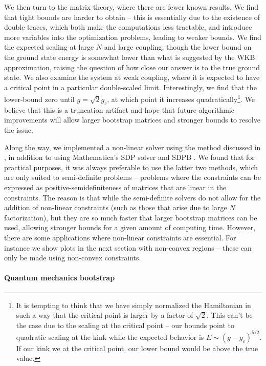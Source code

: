\documentclass[a4paper,11pt]{article}
\numberwithin{equation}{section}
\begin{document}
We then turn to the matrix theory, where there are fewer known results. We find that tight bounds are harder to obtain -- this is essentially due to the existence of double traces, which both make the computations less tractable, and introduce more variables into the optimization problems, leading to weaker bounds. We find the expected scaling at large $N$ and large coupling, though the lower bound on the ground state energy is somewhat lower than what is suggested by the WKB approximation, raising the question of how close our answer is to the true ground state. We also examine the system at weak coupling, where it is expected to have a critical point in a particular double-scaled limit. Interestingly, we find that the lower-bound zero until $g = \sqrt{2} g_c$, at which point it increases quadratically\footnote{It is tempting to think that we have simply normalized the Hamiltonian in such a way that the critical point is larger by a factor of $\sqrt 2$. This can't be the case due to the scaling at the critical point -- our bounds point to quadratic scaling at the kink while the expected behavior is $E \sim (g - g_c)^{5/2}$. If our kink we at the critical point, our lower bound would be above the true value.}. We believe that this is a truncation artifact and hope that future algorithmic improvements will allow larger bootstrap matrices and stronger bounds to resolve the issue.

Along the way, we implemented a non-linear solver using the method discussed in \cite{Han:2020bkb}, in addition to using Mathematica's SDP solver and SDPB \cite{Simmons-Duffin:2015qma}. We found that for practical purposes, it was always preferable to use the latter two methods, which are only suited to semi-definite problems -- problems where the constraints can be expressed as positive-semidefiniteness of matrices that are linear in the constraints. The reason is that while the semi-definite solvers do not allow for the addition of non-linear constraints (such as those that arise due to large $N$ factorization), but they are so much faster that larger bootstrap matrices can be used, allowing stronger bounds for a given amount of computing time. However, there are some applications where non-linear constraints are essential. For instance we show plots in the next section with non-convex regions -- these can only be made using non-convex constraints.

\paragraph{Quantum mechanics bootstrap}
\end{document}
